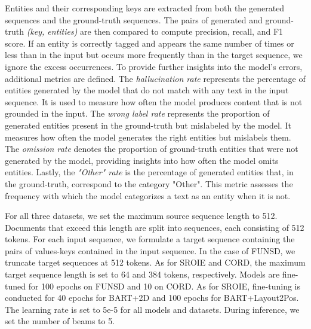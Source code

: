 Entities and their corresponding keys are extracted from both the generated sequences and the ground-truth sequences. The pairs of generated and ground-truth \textit{(key, entities)} are then compared to compute precision, recall, and F1 score. If an entity is correctly tagged and appears the same number of times or less than in the input but occurs more frequently than in the target sequence, we ignore the excess occurrences. To provide further insights into the model's errors, additional metrics are defined. The \textit{hallucination rate} represents the percentage of entities generated by the model that do not match with any text in the input sequence. It is used to measure how often the model produces content that is not grounded in the input. The \textit{wrong label rate} represents the proportion of generated entities present in the ground-truth but mislabeled by the model. It measures how often the model generates the right entities but mislabels them. The \textit{omission rate} denotes the proportion of ground-truth entities that were not generated by the model, providing insights into how often the model omits entities. Lastly, the \textit{"Other" rate} is the percentage of generated entities that, in the ground-truth, correspond to the category "Other". This metric assesses the frequency with which the model categorizes a text as an entity when it is not.



For all three datasets, we set the maximum source sequence length to 512. Documents that exceed this length are split into sequences, each consisting of 512 tokens. For each input sequence, we formulate a target sequence containing the pairs of values-keys contained in the input sequence. In the case of FUNSD, we truncate target sequences at 512 tokens. As for SROIE and CORD, the maximum target sequence length is set to 64 and 384 tokens, respectively. Models are fine-tuned for 100 epochs on FUNSD and 10 on CORD. As for SROIE, fine-tuning is conducted for 40 epochs for BART+2D and 100 epochs for BART+Layout2Pos. The learning rate is set to 5e-5 for all models and datasets. During inference, we set the number of beams to 5.

